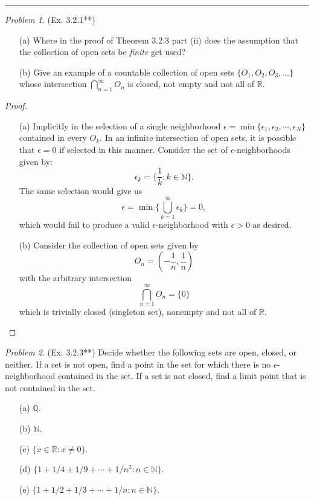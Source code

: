 \documentclass[11pt,twoside, reqno]{amsart}
\theoremstyle{remark}
\newtheorem{Prob}{Problem}
\def\R{\mathbb R}
\def\Q{\mathbb Q}
\def\N{\mathbb N}
\begin{document}
\hrule
{}

\begin{Prob}(Ex. 3.2.1**) 
\begin{enumerate}
    \item [(a)] Where in the proof of Theorem 3.2.3 part (ii) does the assumption that the collection of open sets be \textit{finite} get used?
    \item [(b)] Give an example of a countable collection of open sets $\{O_1,O_2,O_3,\ldots\}$ whose intersection $\bigcap^\infty_{n=1}O_n$ is closed, not empty and not all of $\R$.
\end{enumerate}
\end{Prob}

\begin{proof}
\begin{enumerate}
    \item [(a)] Implicitly in the selection of a single neighborhood $\epsilon = \min\{\epsilon_1,\epsilon_2,\cdots,\epsilon_N\}$ contained in every $O_k$. In an infinite intersection of open sets, it is possible that $\epsilon = 0$ if selected in this manner. Consider the set of $\epsilon$-neighborhoods given by:
    $$
        \epsilon_k = \{\frac{1}{k} : k \in \N\}.
    $$
    The same selection would give us
    $$
        \epsilon = \min \{\bigcup^\infty_{k=1} \epsilon_k\} = 0,
    $$
    which would fail to produce a valid $\epsilon$-neighborhood with $\epsilon > 0$ as desired.
    \item [(b)] Consider the collection of open sets given by
    $$
        O_n = (-\frac{1}{n}, \frac{1}{n})  
    $$
    with the arbitrary intersection
    $$
        \bigcap^\infty_{n=1} O_n = \{0\}
    $$
    which is trivially closed (singleton set), nonempty and not all of $\R$.
\end{enumerate}

\end{proof}

\begin{Prob}(Ex. 3.2.3**) Decide whether the following sets are open, closed, or neither. If a set is not open, find a point in the set for which there is no $\epsilon$-neighborhood contained in the set. If a set is not closed, find a limit point that is not contained in the set.
\begin{enumerate}
    \item [(a)] $\Q$.
    \item [(b)] $\N$.
    \item [(c)] $\{x \in \R : x \neq 0\}$.
    \item [(d)] $\{1 + 1/4 + 1/9 + \cdots + 1/n^2 : n \in \N\}$.
    \item [(e)] $\{1 + 1/2 + 1/3 + \cdots + 1/n : n \in \N\}$.
\end{enumerate}
\end{Prob}
\end{document}
